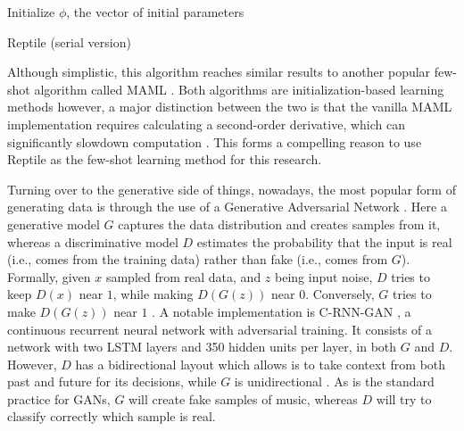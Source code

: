 \IncMargin{1em}
\begin{algorithm}
Initialize $\phi$, the vector of initial parameters


\caption{Reptile (serial version)}
\label{alg:reptile}
\end{algorithm}
\DecMargin{1em}

Although simplistic, this algorithm reaches similar results to another popular few-shot algorithm called MAML \parencite{finn_model-agnostic_2017}. Both algorithms are initialization-based learning methods however, a major distinction between the two is that the vanilla MAML implementation requires calculating a second-order derivative, which can significantly slowdown computation \parencite{nichol_first-order_2018}. This forms a compelling reason to use Reptile as the few-shot learning method for this research.

Turning over to the generative side of things, nowadays, the most popular form of generating data is through the use of a Generative Adversarial Network \parencite[GAN;][]{goodfellow_generative_2014}. Here a generative model $G$ captures the data distribution and creates samples from it, whereas a discriminative model $D$ estimates the probability that the input is real (i.e., comes from the training data) rather than fake (i.e., comes from $G$). Formally, given $x$ sampled from real data, and $z$ being input noise, $D$ tries to keep $D(x)$ near $1$, while making $D(G(z))$ near $0$. Conversely, $G$ tries to make $D(G(z))$ near $1$ \parencite{goodfellow_nips_2016}. A notable implementation is C-RNN-GAN \parencite{mogren_c-rnn-gan_2016}, a continuous recurrent neural network with adversarial training. It consists of a network with two LSTM layers and 350 hidden units per layer, in both $G$ and $D$. However, $D$ has a bidirectional layout which allows is to take context from both past and future for its decisions, while $G$ is unidirectional \parencite{mogren_c-rnn-gan_2016}. As is the standard practice for GANs, $G$ will create fake samples of music, whereas $D$ will try to classify correctly which sample is real.

